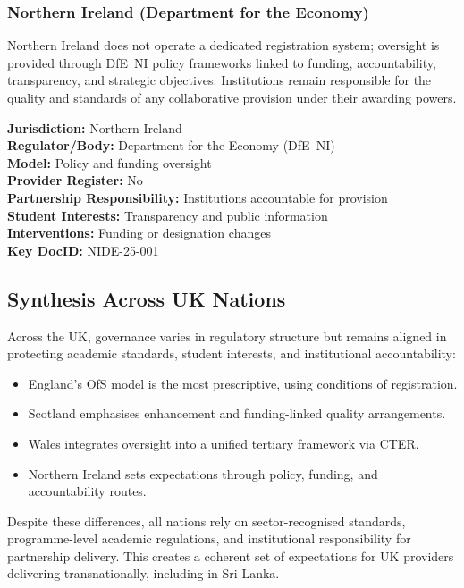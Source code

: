 \subsubsection*{Northern Ireland (Department for the Economy)}

Northern Ireland does not operate a dedicated registration system; oversight is provided
through DfE~NI policy frameworks linked to funding, accountability, transparency, and
strategic objectives. Institutions remain responsible for the quality and standards of any
collaborative provision under their awarding powers.

\begin{tcolorbox}
\textbf{Jurisdiction:} Northern Ireland \\
\textbf{Regulator/Body:} Department for the Economy (DfE~NI) \\
\textbf{Model:} Policy and funding oversight \\
\textbf{Provider Register:} No \\
\textbf{Partnership Responsibility:} Institutions accountable for provision \\
\textbf{Student Interests:} Transparency and public information \\
\textbf{Interventions:} Funding or designation changes \\
\textbf{Key DocID:} NIDE-25-001
\end{tcolorbox}

\subsection{Synthesis Across UK Nations}

Across the UK, governance varies in regulatory structure but remains aligned in protecting
academic standards, student interests, and institutional accountability:

\begin{itemize}
    \item England’s OfS model is the most prescriptive, using conditions of registration.  
    \item Scotland emphasises enhancement and funding-linked quality arrangements.  
    \item Wales integrates oversight into a unified tertiary framework via CTER.  
    \item Northern Ireland sets expectations through policy, funding, and accountability routes.  
\end{itemize}

Despite these differences, all nations rely on sector-recognised standards, programme-level
academic regulations, and institutional responsibility for partnership delivery. This
creates a coherent set of expectations for UK providers delivering transnationally,
including in Sri Lanka.
